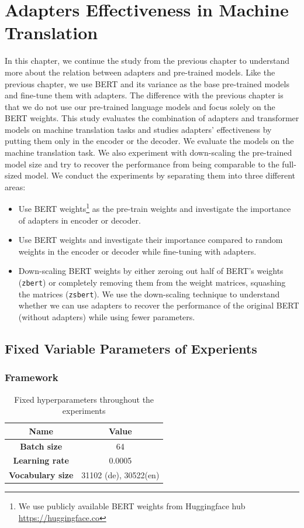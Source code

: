 
\chapter{Adapters Effectiveness in Machine Translation}
\label{chap:adaptefct}
In this chapter, we continue the study from the previous chapter to understand more about the relation between adapters and pre-trained models. Like the previous chapter, we use BERT and its variance as the base pre-trained models and fine-tune them with adapters. The difference with the previous chapter is that we do not use our pre-trained language models and focus solely on the BERT weights. This study evaluates the combination of adapters and transformer models on machine translation tasks and studies adapters' effectiveness by putting them only in the encoder or the decoder. We evaluate the models on the machine translation task. We also experiment with down-scaling the pre-trained model size and try to recover the performance from being comparable to the full-sized model. We conduct the experiments by separating them into three different areas:
\begin{itemize}
    \item Use BERT weights\footnote{We use publicly available BERT weights from Huggingface hub \url{https://huggingface.co}} as the pre-train weights and investigate the importance of adapters in encoder or decoder.
    \item Use BERT weights and investigate their importance compared to random weights in the encoder or decoder while fine-tuning with adapters.
    \item Down-scaling BERT weights by either zeroing out half of BERT's weights (\texttt{zbert}) or completely removing them from the weight matrices, squashing the matrices (\texttt{zsbert}). We use the down-scaling technique to understand whether we can use adapters to recover the performance of the original BERT (without adapters) while using fewer parameters.
\end{itemize}

\section{Fixed Variable Parameters of Experients}
\subsection{Framework}
\begin{table}[]
    \centering
    \begin{tabular}{@{}cc@{}}
        \toprule
        \textbf{Name}            & \textbf{Value}        \\ \midrule
        \textbf{Batch size}      & 64                    \\
        \textbf{Learning rate}   & 0.0005                \\
        \textbf{Vocabulary size} & 31102 (de), 30522(en) \\ \bottomrule
    \end{tabular}
    \caption{Fixed hyperparameters throughout the experiments}
    \label{tab:hyp_invest}
\end{table}

